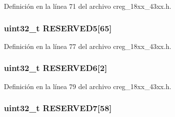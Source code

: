 Definición en la línea 71 del archivo creg\+\_\+18xx\+\_\+43xx.\+h.

\subsubsection[{\texorpdfstring{R\+E\+S\+E\+R\+V\+E\+D5}{RESERVED5}}]{ uint32\+\_\+t R\+E\+S\+E\+R\+V\+E\+D5\mbox{[}65\mbox{]}}\hypertarget{struct_l_p_c___c_r_e_g___t_a55fa3b6edd9e7b7ce421eb582cb3fb11}{}\label{struct_l_p_c___c_r_e_g___t_a55fa3b6edd9e7b7ce421eb582cb3fb11}


Definición en la línea 77 del archivo creg\+\_\+18xx\+\_\+43xx.\+h.

\subsubsection[{\texorpdfstring{R\+E\+S\+E\+R\+V\+E\+D6}{RESERVED6}}]{ uint32\+\_\+t R\+E\+S\+E\+R\+V\+E\+D6\mbox{[}2\mbox{]}}\hypertarget{struct_l_p_c___c_r_e_g___t_a63b131c3741e5e6a084f6da701f19fc4}{}\label{struct_l_p_c___c_r_e_g___t_a63b131c3741e5e6a084f6da701f19fc4}


Definición en la línea 79 del archivo creg\+\_\+18xx\+\_\+43xx.\+h.

\subsubsection[{\texorpdfstring{R\+E\+S\+E\+R\+V\+E\+D7}{RESERVED7}}]{ uint32\+\_\+t R\+E\+S\+E\+R\+V\+E\+D7\mbox{[}58\mbox{]}}\hypertarget{struct_l_p_c___c_r_e_g___t_a78458cd3eeae09ef03bd1f4ddbf51c55}{}\label{struct_l_p_c___c_r_e_g___t_a78458cd3eeae09ef03bd1f4ddbf51c55}


